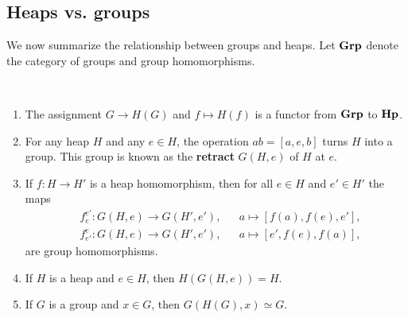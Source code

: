 \documentclass{svmult}
\newcommand{\category}[1]{{\normalfont\textbf{#1}}}
\newcommand{\Grp}{\category{Grp}}
\newcommand{\Hp}{\category{Hp}}
\begin{document}
\subsection{Heaps vs. groups}

We now summarize the relationship between groups and heaps. Let $\Grp$ denote 
the category of groups and group homomorphisms. 

\begin{theorem}\
\label{thm:heaps_and_groups}
\begin{enumerate}
    \item The assignment $G\to H(G)$ and $f\mapsto H(f)$ is a functor from $\Grp$ to $\Hp$.
    \item For any heap $H$ and any $e\in H$, the operation $ab=[a,e,b]$ turns $H$ into a group. 
    This group is known as the \textbf{retract} 
    $G(H,e)$ of $H$ at $e$. 
    \item If $f\colon H\to H'$ is a heap homomorphism, then for all $e\in H$ and $e'\in H'$
    the maps
    \begin{align*}
        &f_e^{e'}\colon G(H,e)\to G(H',e'),&&a\mapsto [f(a),f(e),e'],\\
        &f_{e'}^{e}\colon G(H,e)\to G(H',e'),&&a\mapsto [e',f(e),f(a)],
    \end{align*}
    are group homomorphisms. 
    \item If $H$ is a heap and $e\in H$, then $H(G(H,e))=H$.
    \item If $G$ is a group and $x\in G$, then $G(H(G),x)\simeq G$. 
\end{enumerate}
\end{theorem}
\end{document}
